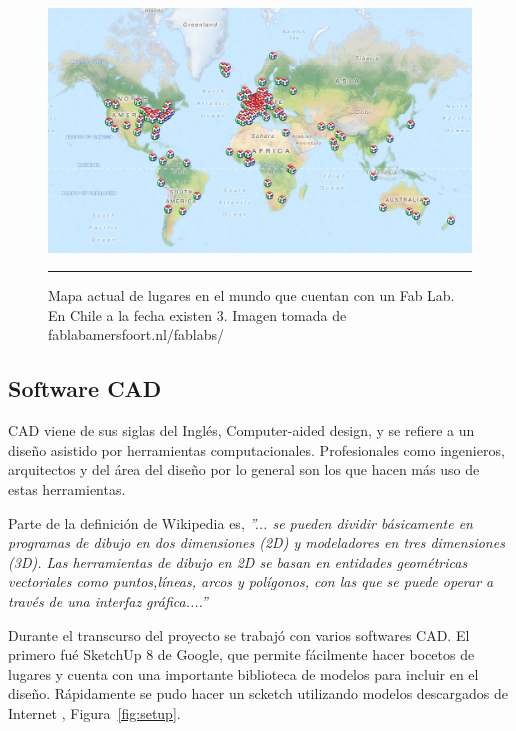 \begin{figure}[htbp]
	\centering
		\includegraphics[width=\textwidth]{./Figures/map.png}
		\rule{35em}{0.5pt}
	\caption[Mapa Fab Labs en el mundo.]{Mapa actual de lugares en el mundo que cuentan con un Fab Lab. En Chile a la fecha existen 3. Imagen tomada de fablabamersfoort.nl/fablabs/}
	\label{fig:Fablabs}
\end{figure}	





\subsection{Software CAD}

CAD viene de sus siglas del Inglés, Computer-aided design, y se refiere a un diseño asistido por herramientas computacionales. Profesionales como ingenieros, arquitectos y del área del diseño por lo general son los que hacen más uso de estas herramientas.

Parte de la definición de Wikipedia es, \textit{”... se pueden dividir básicamente en programas de dibujo en dos dimensiones (2D) y modeladores en tres dimensiones (3D). Las herramientas de dibujo en 2D se basan en entidades geométricas vectoriales como puntos,líneas, arcos y polígonos, con las que se puede operar a través de una interfaz gráfica....”}

Durante el transcurso del proyecto se trabajó con varios softwares CAD. El primero fué SketchUp 8 de Google, que permite fácilmente hacer bocetos de lugares y cuenta con una importante biblioteca de modelos para incluir en el diseño. Rápidamente se pudo hacer un scketch utilizando modelos descargados de Internet , Figura~\ref{fig:setup}.


